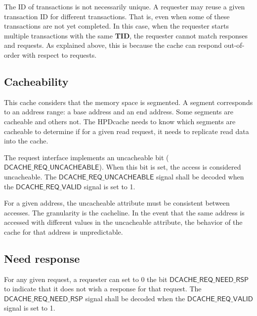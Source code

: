 \documentclass[10pt,titlepage,twoside]{book}
\begin{document}
The ID of transactions is not necessarily unique.
A requester may reuse a given transaction ID for different transactions.
That is, even when some of these transactions are not yet completed.
In this case, when the requester starts multiple transactions with the same \textbf{TID}, the requester cannot match responses and requests.
As explained above, this is because the cache can respond out-of-order with respect to requests.


\subsection{Cacheability}

This cache considers that the memory space is segmented.
A segment corresponds to an address range: a base address and an end address.
Some segments are cacheable and others not.
The \ac{HPDcache} needs to know which segments are cacheable to determine if for a given read request, it needs to replicate read data into the cache.

The request interface implements an uncacheable bit ($\mathsf{DCACHE\_REQ\_UNCACHEABLE}$).
When this bit is set, the access is considered uncacheable.
The $\mathsf{DCACHE\_REQ\_UNCACHEABLE}$ signal shall be decoded when the $\mathsf{DCACHE\_REQ\_VALID}$ signal is set to 1.

\begin{tcolorbox}[colback=red!10!white,
                  colframe=white!10!red,
                  title=\textbf{Important},
                  center, valign=top, halign=left,
                  center title,
                  width=.950\linewidth]
For a given address, the uncacheable attribute must be consistent between accesses.
The granularity is the cacheline.
In the event that the same address is accessed with different values in the uncacheable attribute, the behavior of the cache for that address is unpredictable.
\end{tcolorbox}


\subsection{Need response}%

For any given request, a requester can set to 0 the bit $\mathsf{DCACHE\_REQ\_NEED\_RSP}$ to indicate that it does not wish a response for that request.
The $\mathsf{DCACHE\_REQ\_NEED\_RSP}$ signal shall be decoded when the $\mathsf{DCACHE\_REQ\_VALID}$ signal is set to 1.
\end{document}
